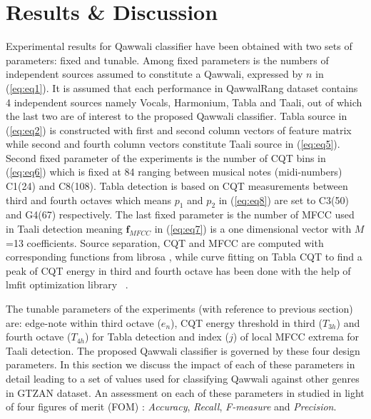 \documentclass{article}
\begin{document}
\section{Results \& Discussion}\label{sec:result}
Experimental results for Qawwali classifier have been obtained with two sets of parameters: fixed and tunable. Among fixed parameters is the numbers of independent sources assumed to constitute a Qawwali, expressed by ${n}$ in (\ref{eq:eq1}). It is assumed that each performance in QawwalRang dataset contains 4 independent sources namely Vocals, Harmonium, Tabla and Taali, out of which the last two are of interest to the proposed Qawwali classifier. Tabla source in (\ref{eq:eq2}) is constructed with first and second column vectors of feature matrix while second and fourth column vectors constitute Taali source in (\ref{eq:eq5}). Second fixed parameter of the experiments is the number of CQT bins in (\ref{eq:eq6}) which is fixed at 84 ranging between musical notes (midi-numbers) C1(24) and C8(108). Tabla detection is based on CQT measurements between third and fourth octaves which means $p_{1}$ and $p_{2}$ in (\ref{eq:eq8}) are set to C3(50) and G4(67) respectively. The last fixed parameter is the number of MFCC used in Taali detection meaning $\boldsymbol{f}_{MFCC}$ in (\ref{eq:eq7}) is a one dimensional vector with $M$=13 coefficients. Source separation, CQT and MFCC are computed with corresponding functions from librosa \citep{brian_mcfee_2022_6097378}, while curve fitting on Tabla CQT to find a peak of CQT energy in third and fourth octave has been done with the help of lmfit optimization library ~\citep{newville_matthew_2014}.

The tunable parameters of the experiments (with reference to previous section) are: edge-note within third octave ($e_{n}$), CQT energy threshold in third ($T_{3h}$) and fourth octave ($T_{4h}$) for Tabla detection and index ($j$) of local MFCC extrema for Taali detection. The proposed Qawwali classifier is governed by these four design parameters. In this section we discuss the impact of each of these parameters in detail leading to a set of values used for classifying Qawwali against other genres in GTZAN dataset. An assessment on each of these parameters in studied in light of four figures of merit (FOM) \citep{music_genre_survey}: \textit{Accuracy}, \textit{Recall}, \textit{F-measure} and \textit{Precision}.
\end{document}
